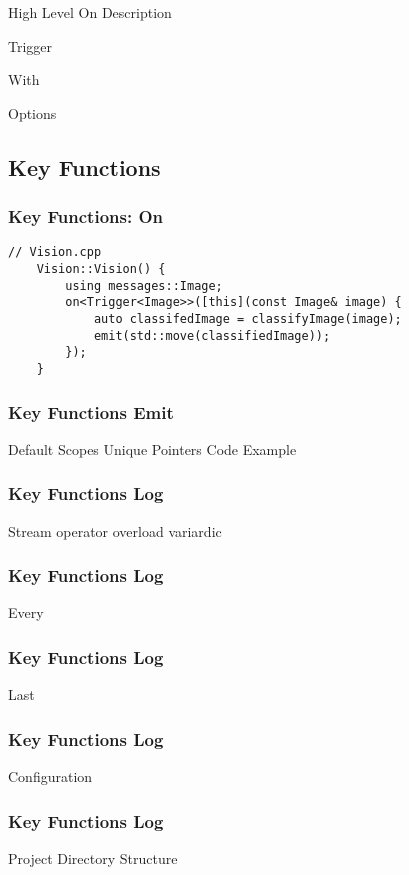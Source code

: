\documentclass{beamer}
\begin{document}
\begin{frame}
	High Level On Description
\end{frame}

\begin{frame}
	Trigger
\end{frame}

\begin{frame}
	With
\end{frame}

\begin{frame}
	Options
\end{frame}

\subsection{Key Functions}
\begin{frame}[fragile]
    \frametitle{Key Functions: On}
	\begin{lstlisting}[language=nuclear]
	// Vision.cpp
	Vision::Vision() {
	    using messages::Image;
	    on<Trigger<Image>>([this](const Image& image) {
	        auto classifedImage = classifyImage(image);
	        emit(std::move(classifiedImage));
	    });
	}
	\end{lstlisting}
\end{frame}

\begin{frame}
    \frametitle{Key Functions Emit}
	Default
	Scopes
	Unique Pointers
	Code Example
\end{frame}

\begin{frame}
    \frametitle{Key Functions Log}
	Stream operator overload
	variardic
\end{frame}

\begin{frame}
    \frametitle{Key Functions Log}
	Every
\end{frame}

\begin{frame}
    \frametitle{Key Functions Log}
	Last
\end{frame}

\begin{frame}
    \frametitle{Key Functions Log}
	Configuration
\end{frame}


\begin{frame}
    \frametitle{Key Functions Log}
	Project Directory Structure
\end{frame}
\end{document}
